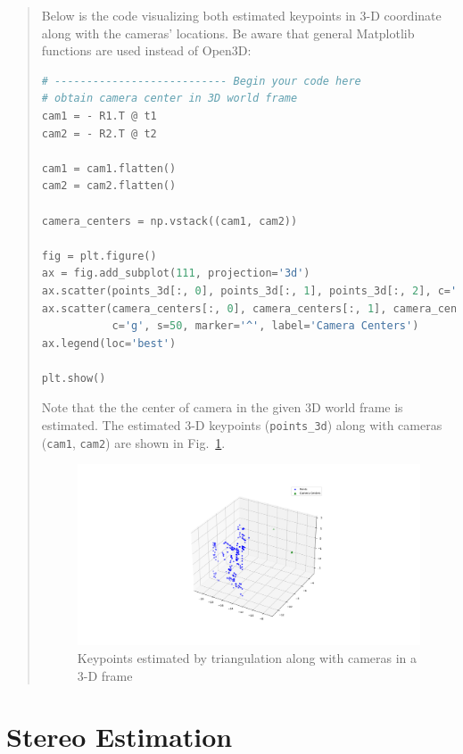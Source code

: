 \documentclass[11pt]{article}
\begin{document}
\begin{quote}
Below is the code visualizing both estimated keypoints in 3-D coordinate along with the cameras' locations. Be aware that general Matplotlib functions are used instead of Open3D:

\begin{lstlisting}[language=Python, basicstyle=\scriptsize]
# --------------------------- Begin your code here
# obtain camera center in 3D world frame
cam1 = - R1.T @ t1
cam2 = - R2.T @ t2

cam1 = cam1.flatten()
cam2 = cam2.flatten()

camera_centers = np.vstack((cam1, cam2))

fig = plt.figure()
ax = fig.add_subplot(111, projection='3d')
ax.scatter(points_3d[:, 0], points_3d[:, 1], points_3d[:, 2], c='b', label='Points')
ax.scatter(camera_centers[:, 0], camera_centers[:, 1], camera_centers[:, 2], \
           c='g', s=50, marker='^', label='Camera Centers')
ax.legend(loc='best')

plt.show()

\end{lstlisting}

Note that the the center of camera in the given 3D world frame is estimated. The estimated 3-D keypoints (\texttt{points\_3d}) along with cameras (\texttt{cam1}, \texttt{cam2}) are shown in Fig.~\ref{fig:triangulation}.

\begin{figure}[h]
    \centering
    \includegraphics[width=1.0\linewidth]{triangulation.png}
    \caption{Keypoints estimated by triangulation along with cameras in a 3-D frame}
    \label{fig:triangulation}
\end{figure}

\end{quote}

\section*{Stereo Estimation}
\end{document}
